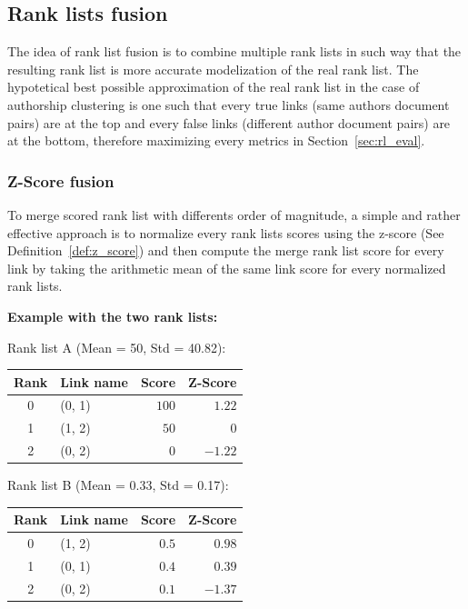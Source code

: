 \subsection{Rank lists fusion}
\label{sec:rank_lists_fusion}

The idea of rank list fusion is to combine multiple rank lists in such way that the resulting rank list is more accurate modelization of the real rank list.
The hypotetical best possible approximation of the real rank list in the case of authorship clustering is one such that  every true links (same authors document pairs) are at the top and every false links (different author document pairs) are at the bottom, therefore maximizing every metrics in Section~\ref{sec:rl_eval}.

\subsubsection{Z-Score fusion}

To merge scored rank list with differents order of magnitude, a simple and rather effective approach is to normalize every rank lists scores using the z-score (See Definition~\ref{def:z_score}) and then compute the merge rank list score for every link by taking the arithmetic mean of the same link score for every normalized rank lists.

\textbf{Example with the two rank lists:}

Rank list A (Mean = 50, Std = 40.82):

\begin{tabular}{c l r r}
  \toprule
  Rank & Link name & Score & Z-Score \\
  \midrule
  0 & (0, 1) & $100$ & $1.22$ \\
  1 & (1, 2) & $50$ & $0$ \\
  2 & (0, 2) & $0$ & $-1.22$ \\
  \bottomrule
\end{tabular}

Rank list B (Mean = 0.33, Std = 0.17):

\begin{tabular}{c l r r}
  \toprule
  Rank & Link name & Score & Z-Score \\
  \midrule
  0 & (1, 2) & $0.5$ & $0.98$ \\
  1 & (0, 1) & $0.4$ & $0.39$ \\
  2 & (0, 2) & $0.1$ & $-1.37$ \\
  \bottomrule
\end{tabular}

